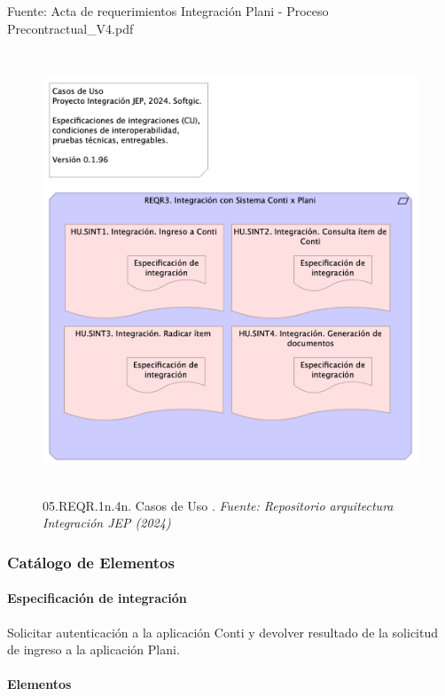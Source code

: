 \documentclass[
  paper=a4,
  ,captions=tableheading
]{scrartcl}
\begin{document}
Fuente: Acta de requerimientos Integración Plani - Proceso
Precontractual\_V4.pdf

\begin{figure}
\centering
\includegraphics[width=\textwidth,height=5.20833in]{images/05.REQR.1n.4n.CasosdeUso.png}
\caption{05.REQR.1n.4n. Casos de Uso . \emph{Fuente: Repositorio
arquitectura Integración JEP
(2024)}}\label{fig:id-eb0cac3ffa954ca0aa6a48e757b4d309}
\end{figure}

\subsubsection{Catálogo de
Elementos}\label{sec:catuxe1logo-de-elementos}

\paragraph{Especificación de
integración}\label{sec:especificaciuxf3n-de-integraciuxf3n}

Solicitar autenticación a la aplicación Conti y devolver resultado de la
solicitud de ingreso a la aplicación Plani.

\paragraph{Elementos}\label{sec:elementos}
\end{document}
